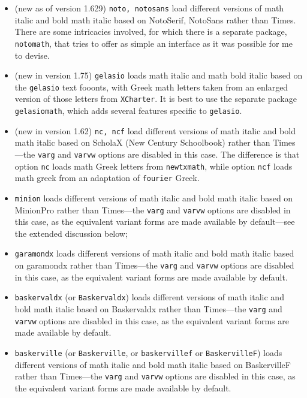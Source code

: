 \documentclass[\fsc]{article}
\theoremstyle{oldplain}
\theoremstyle{plain}
\begin{document}
\begin{itemize}
\item (new as of version 1.629) {\tt noto, notosans} load different versions of math italic and bold math italic based on \textsf{NotoSerif}, \textsf{NotoSans}  rather than \textsf{Times}. There are some intricacies involved, for which there is a separate package, {\tt notomath}, that tries to offer as simple an interface as it was possible for me to devise.
\item (new in version 1.75) {\tt gelasio} loads math italic and math bold italic based on the {\tt gelasio} text fooonts, with Greek math letters taken from an enlarged version of those letters from {\tt XCharter}. It is best to use the separate package {\tt gelasiomath}, which adds several features specific to {\tt gelasio}.
\item (new in version 1.62) {\tt nc, ncf} load different versions of math italic and bold math italic based on \textsf{ScholaX} (\textsf{New Century Schoolbook}) rather than \textsf{Times}---the {\tt varg} and {\tt varvw} options are disabled in this case. The difference is that option {\tt nc} loads math Greek letters from {\tt newtxmath}, while option {\tt ncf} loads math greek from an adaptation of {\tt fourier} Greek.
\item {\tt minion} loads different versions of math italic and bold math italic based on \textsf{MinionPro} rather than \textsf{Times}---the {\tt varg} and {\tt varvw} options are disabled in this case, as the equivalent variant forms are made available by default---see the extended discussion below;
\item {\tt garamondx} loads different versions of math italic and bold math italic based on \textsf{garamondx} rather than \textsf{Times}---the {\tt varg} and {\tt varvw} options are disabled in this case, as the equivalent variant forms are made available by default.
\item {\tt baskervaldx} (or {\tt Baskervaldx}) loads different versions of math italic and bold math italic based on \textsf{Baskervaldx} rather than \textsf{Times}---the {\tt varg} and {\tt varvw} options are disabled in this case, as the equivalent variant forms are made available by default.
\item {\tt baskerville} (or {\tt Baskerville}, or {\tt baskervillef} or {\tt BaskervilleF}) loads different versions of math italic and bold math italic based on \textsf{BaskervilleF} rather than \textsf{Times}---the {\tt varg} and {\tt varvw} options are disabled in this case, as the equivalent variant forms are made available by default.

\end{itemize}
\end{document}
